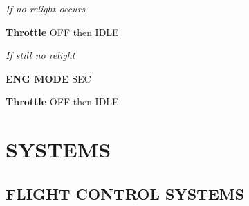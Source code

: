 \documentclass[fontSpartan]{TechCheck}
\begin{document}
\begin{tableitemize}
{		\emph{If no relight occurs}
		\begin{subenumerate}[start=4]
			\item \textbf{Throttle} \dotfill OFF then IDLE
		\end{subenumerate}

		\emph{If still no relight}
		\begin{subenumerate}[start=5]
			\item \textbf{ENG MODE} \dotfill SEC
			\item \textbf{Throttle} \dotfill OFF then IDLE
		\end{subenumerate}}
	\end{tableitemize}

	\cleardoublepage

	\chapter{SYSTEMS}
	\minitoc
	\cleardoublepage

	\section{FLIGHT CONTROL SYSTEMS}
\end{document}
